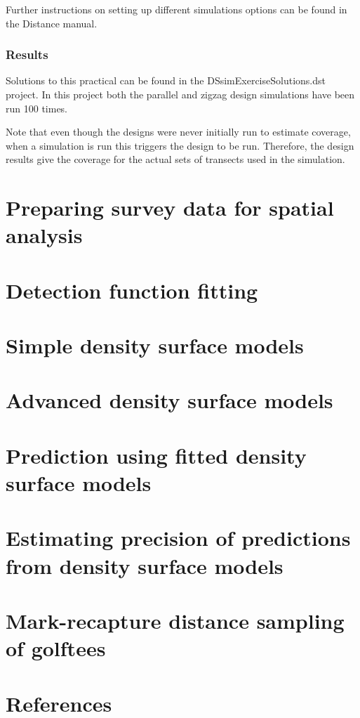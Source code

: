 \documentclass[]{book}
\theoremstyle{definition}
\theoremstyle{definition}
\theoremstyle{remark}
\begin{document}
Further instructions on setting up different simulations options can be
found in the Distance manual.

\subsection{Results}\label{results}

Solutions to this practical can be found in the
DSsimExerciseSolutions.dst project. In this project both the parallel
and zigzag design simulations have been run 100 times.

Note that even though the designs were never initially run to estimate
coverage, when a simulation is run this triggers the design to be run.
Therefore, the design results give the coverage for the actual sets of
transects used in the simulation.

\chapter{Preparing survey data for spatial
analysis}\label{preparing-survey-data-for-spatial-analysis}

\chapter{Detection function fitting}\label{detection-function-fitting}

\chapter{Simple density surface
models}\label{simple-density-surface-models}

\chapter{Advanced density surface
models}\label{advanced-density-surface-models}

\chapter{Prediction using fitted density surface
models}\label{prediction-using-fitted-density-surface-models}

\chapter{Estimating precision of predictions from density surface
models}\label{estimating-precision-of-predictions-from-density-surface-models}

\chapter{Mark-recapture distance sampling of
golftees}\label{mark-recapture-distance-sampling-of-golftees}

\chapter*{References}\label{references}
\end{document}
